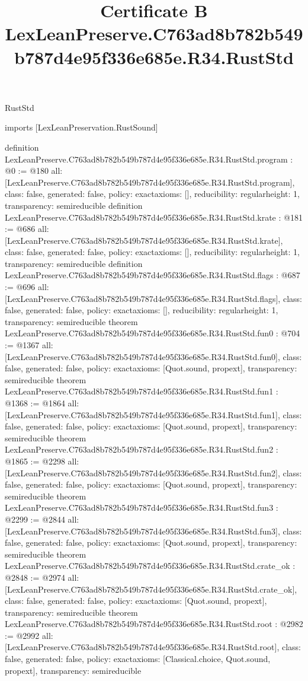 \begin{lexlean}{RustStd}
\title{Certificate B LexLeanPreserve.C763ad8b782b549b787d4e95f336e685e.R34.RustStd}
\begin{coremodule}
imports [LexLeanPreservation.RustSound]

definition LexLeanPreserve.C763ad8b782b549b787d4e95f336e685e.R34.RustStd.program : @0 := @180 {
  all: [LexLeanPreserve.C763ad8b782b549b787d4e95f336e685e.R34.RustStd.program],
  class: false,
  generated: false,
  policy: exact{axioms: []},
  reducibility: regular{height: 1},
  transparency: semireducible
}
definition LexLeanPreserve.C763ad8b782b549b787d4e95f336e685e.R34.RustStd.krate : @181 := @686 {
  all: [LexLeanPreserve.C763ad8b782b549b787d4e95f336e685e.R34.RustStd.krate],
  class: false,
  generated: false,
  policy: exact{axioms: []},
  reducibility: regular{height: 1},
  transparency: semireducible
}
definition LexLeanPreserve.C763ad8b782b549b787d4e95f336e685e.R34.RustStd.flags : @687 := @696 {
  all: [LexLeanPreserve.C763ad8b782b549b787d4e95f336e685e.R34.RustStd.flags],
  class: false,
  generated: false,
  policy: exact{axioms: []},
  reducibility: regular{height: 1},
  transparency: semireducible
}
theorem LexLeanPreserve.C763ad8b782b549b787d4e95f336e685e.R34.RustStd.fun0 : @704 := @1367 {
  all: [LexLeanPreserve.C763ad8b782b549b787d4e95f336e685e.R34.RustStd.fun0],
  class: false,
  generated: false,
  policy: exact{axioms: [Quot.sound, propext]},
  transparency: semireducible
}
theorem LexLeanPreserve.C763ad8b782b549b787d4e95f336e685e.R34.RustStd.fun1 : @1368 := @1864 {
  all: [LexLeanPreserve.C763ad8b782b549b787d4e95f336e685e.R34.RustStd.fun1],
  class: false,
  generated: false,
  policy: exact{axioms: [Quot.sound, propext]},
  transparency: semireducible
}
theorem LexLeanPreserve.C763ad8b782b549b787d4e95f336e685e.R34.RustStd.fun2 : @1865 := @2298 {
  all: [LexLeanPreserve.C763ad8b782b549b787d4e95f336e685e.R34.RustStd.fun2],
  class: false,
  generated: false,
  policy: exact{axioms: [Quot.sound, propext]},
  transparency: semireducible
}
theorem LexLeanPreserve.C763ad8b782b549b787d4e95f336e685e.R34.RustStd.fun3 : @2299 := @2844 {
  all: [LexLeanPreserve.C763ad8b782b549b787d4e95f336e685e.R34.RustStd.fun3],
  class: false,
  generated: false,
  policy: exact{axioms: [Quot.sound, propext]},
  transparency: semireducible
}
theorem LexLeanPreserve.C763ad8b782b549b787d4e95f336e685e.R34.RustStd.crate_ok : @2848 := @2974 {
  all: [LexLeanPreserve.C763ad8b782b549b787d4e95f336e685e.R34.RustStd.crate_ok],
  class: false,
  generated: false,
  policy: exact{axioms: [Quot.sound, propext]},
  transparency: semireducible
}
theorem LexLeanPreserve.C763ad8b782b549b787d4e95f336e685e.R34.RustStd.root : @2982 := @2992 {
  all: [LexLeanPreserve.C763ad8b782b549b787d4e95f336e685e.R34.RustStd.root],
  class: false,
  generated: false,
  policy: exact{axioms: [Classical.choice, Quot.sound, propext]},
  transparency: semireducible
}


\end{coremodule}
\end{lexlean}
